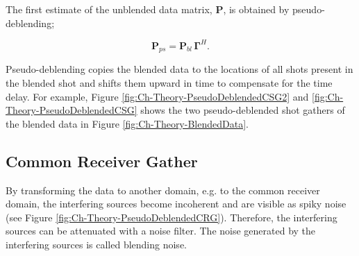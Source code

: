 The first estimate of the unblended data matrix, $\mathbf{P}$, is obtained by pseudo-deblending;

\begin{equation}
	\mathbf{P}_{ps} = \mathbf{P}_{bl} \, \mathbf{\Gamma}^H.
	\label{eq:Ch-Theory-PseudoDeblended}
\end{equation}

Pseudo-deblending copies the blended data to the locations of all shots present in the blended shot and shifts them  upward in time to compensate for the time delay. For example, Figure \ref{fig:Ch-Theory-PseudoDeblendedCSG2} and \ref{fig:Ch-Theory-PseudoDeblendedCSG} shows the two pseudo-deblended shot gathers of the blended data in Figure \ref{fig:Ch-Theory-BlendedData}.


\subsection{Common Receiver Gather}
By transforming the data to another domain, e.g. to the common receiver domain, the interfering sources become incoherent and are visible as spiky noise (see Figure \ref{fig:Ch-Theory-PseudoDeblendedCRG}). Therefore, the interfering sources can be attenuated with a noise filter. The noise generated by the interfering sources is called blending noise. 


